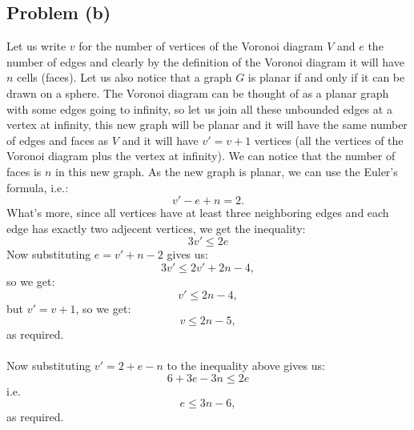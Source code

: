 \subsection*{Problem (b)}
Let us write \(v\) for the number of vertices of the Voronoi diagram \(V\) and \(e\) the number of edges and clearly by the definition of the Voronoi diagram it will have \(n\) cells (faces). Let us also notice that a graph \(G\) is planar if and only if it can be drawn on a sphere. The Voronoi diagram can be thought of as a planar graph with some edges going to infinity, so let us join all these unbounded edges at a vertex at infinity, this new graph will be planar and it will have the same number of edges and faces as \(V\) and it will have \(v' = v+1\) vertices (all the vertices of the Voronoi diagram plus the vertex at infinity). We can notice that the number of faces is \(n\) in this new graph. As the new graph is planar, we can use the Euler's formula, i.e.:
\[v' - e + n = 2.\]
What's more, since all vertices have at least three neighboring edges and each edge has exactly two adjecent vertices, we get the inequality:
\[3v' \leq 2e\]
Now substituting \(e=v' + n - 2 \) gives us:
\[3v' \leq 2v' +2n - 4,\]
so we get: 
\[v' \leq 2n - 4,\]
but \(v'=v+1\), so we get:
\[v \leq 2n - 5,\]
as required.
\\\\Now substituting \(v'=2 + e - n \) to the inequality above gives us:
\[6 + 3e - 3n \leq 2e\]
i.e.
\[e\leq 3n-6,\]
as required.